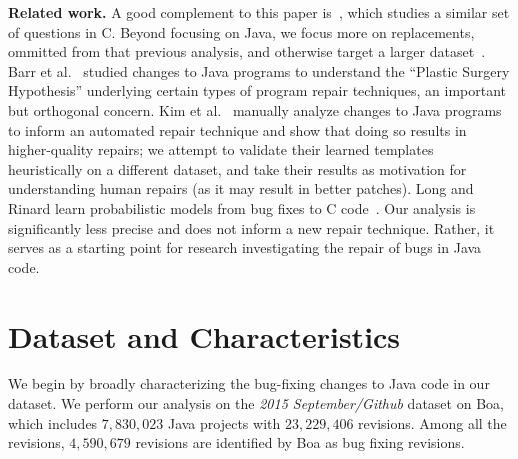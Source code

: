 \documentclass{sig-alternate-05-2015}
\begin{document}


\noindent\textbf{Related work.} A good complement to this paper is~\cite{zhong2015}, which studies 
a similar set of questions in C.  Beyond focusing on Java, we focus more on
replacements, ommitted from that previous analysis, and otherwise target a
larger dataset~\cite{dyer2013}.  Barr et al.~\cite{Barr14fse} studied changes to
Java programs to understand the ``Plastic Surgery Hypothesis'' underlying
certain types of program repair techniques, an important but orthogonal
concern. Kim et al.~\cite{kim2013} manually analyze 
changes to Java programs to inform an automated repair
technique and show that doing so results in higher-quality repairs; 
we attempt to validate their learned templates heuristically on
a different dataset, and take their results as
motivation for understanding human repairs (as it may result in better patches).
Long and Rinard learn probabilistic models from bug fixes to C
code~\cite{Long2016}. Our analysis is significantly less precise and does not
inform a new repair technique.  Rather, it serves as a starting
point for research investigating the repair of bugs in Java code.

\section{Dataset and Characteristics}

We begin by broadly characterizing the bug-fixing changes to Java code in our
dataset.  We perform our analysis on the \emph{2015 September/Github} dataset on
Boa, which includes $7,830,023$ Java projects with $23,229,406$ revisions. Among
all the revisions, $4,590,679$ revisions are identified by Boa as bug fixing
revisions.
\end{document}
